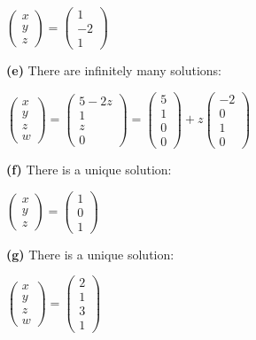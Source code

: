 \documentclass[oneside,12pt]{amsart}
\begin{document}
\bigskip

$
\begin{pmatrix}
x \\  y \\ z
\end{pmatrix}
=
\begin{pmatrix}
1 \\
-2 \\
1
\end{pmatrix}
$

\bigskip

\textbf{(e)}  There are infinitely many solutions:

\bigskip

$
\begin{pmatrix}
x \\  y \\z \\ w
\end{pmatrix}
=
\begin{pmatrix}
5-2z \\
1 \\
z \\
0
\end{pmatrix}
=
\begin{pmatrix}
5\\
1 \\
0 \\
0
\end{pmatrix}
+
z
\begin{pmatrix}
-2 \\
0 \\
1 \\
0
\end{pmatrix}
$


\bigskip

\textbf{(f)} There is a unique solution:

\bigskip

$
\begin{pmatrix}
x \\  y \\ z
\end{pmatrix}
=
\begin{pmatrix}
1 \\
0 \\
1
\end{pmatrix}
$

\bigskip

\textbf{(g)} There is a unique solution:

\bigskip

$
\begin{pmatrix}
x \\  y \\ z \\ w
\end{pmatrix}
=
\begin{pmatrix}
2 \\
1 \\
3 \\
1
\end{pmatrix}
$
\end{document}
